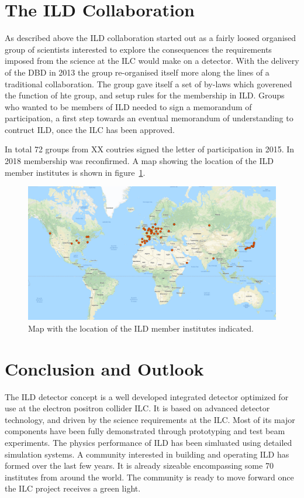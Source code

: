 \documentclass[%
 amsmath,amssymb,
 aps,
]{revtex4-1}
\begin{document}
\section{The ILD Collaboration}
As described above the ILD collaboration started out as a fairly loosed organised group of scientists interested to explore the consequences the requirements imposed from the science at the ILC would make on a detector. With the delivery of the DBD in 2013 the group re-organised itself more along the lines of a traditional collaboration. The group gave itself a set of by-laws which goverened the function of hte group, and setup rules for the membership in ILD. Groups who wanted to be members of ILD needed to sign a memorandum of participation, a first step towards an eventual memorandum of understanding to contruct ILD, once the ILC has been approved. 

In total 72 groups from XX coutries signed the letter of participation in 2015. In 2018 membership was reconfirmed. A map showing the location of the ILD member institutes is shown in figure~\ref{ild-fig-membermap}.

\begin{figure}
    \centering
    \includegraphics[width=0.6\hsize]{figures/ILD_members_map.pdf}
    \caption{Map with the location of the ILD member institutes indicated.}
    \label{ild-fig-membermap}
\end{figure}



\section{Conclusion and Outlook}
The ILD detector concept is a well developed integrated detector optimized for use at the electron positron collider ILC. It is based on advanced detector technology, and driven by the science requirements at the ILC. Most of its major components have been fully demonstrated through prototyping and test beam experiments. The physics performance of ILD has been simluated using detailed simulation systems. A community interested in building and operating ILD has formed over the last few years. It is already sizeable encompassing some 70 institutes from around the world. The community is ready to move forward once the ILC project receives a green light. 




\end{document}

